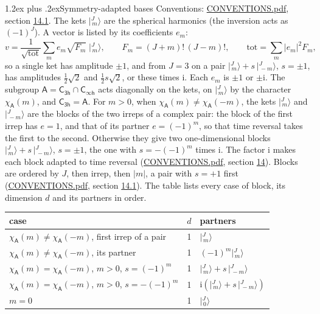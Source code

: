 \documentclass[10pt,a4paper]{article}
\makeatletter
\renewcommand\section{\@startsection{section}{1}{\z@}{-3ex plus -1ex minus -.2ex}%
  {1.2ex plus .2ex}{\normalfont\large\sffamily\bfseries\color{parttitle}}}
\numberwithin{equation}{section}
\newcommand{\grp}[1]{\mathsf{#1}}
\newcommand{\iunit}{\mathrm{i}}
\newcommand{\chiA}{\chi_{\grp{A}}}
\newcommand{\jm}[2]{\bigl\lvert{}^{#1}_{\,#2}\bigr\rangle}
\makeatother
\begin{document}
\section{Symmetry-adapted bases}\label{s:bases}
Conventions: \href{../../CONVENTIONS.pdf}{CONVENTIONS.pdf}, section \href{../../CONVENTIONS.pdf\#conv.14.1}{14.1}.
\leavevmode\label{n:index.m}\label{n:vector.ket}The kets $\jm{J}{m}$ are the spherical harmonics (the inversion acts as $(-1)^J$). \label{n:index.ketcoefficient}\label{n:vector.basis.symmetry}\label{n:index.ketweight}\label{n:index.total}A vector is listed by its coefficients $e_m$:
\begin{equation}\label{e:ket}v = \frac{1}{\sqrt{\mathrm{tot}}}\sum_m e_m\sqrt{F_m}\;\jm{J}{m},\qquad F_m = (J+m)!\,(J-m)!,\qquad \mathrm{tot} = \sum_m |e_m|^2F_m,\end{equation}
\leavevmode\label{n:index.pair.sign}so a single ket has amplitude $\pm1$, and from $J = 3$ on a pair $\jm{J}{m} + s\,\jm{J}{-m}$, $s = \pm1$, has amplitudes $\tfrac{1}{2}\sqrt{2}$ and $\tfrac{1}{2}s\sqrt{2}$, or these times $\iunit$. Each $e_m$ is $\pm1$ or $\pm\iunit$.
\leavevmode\label{n:group.A}\label{n:function.character.abelian}The subgroup $\grp{A} = \grp{C_{3h}}\cap\grp{C_{\infty h}}$ acts diagonally on the kets, on $\jm{J}{m}$ by the character $\chiA(m)$, and $\grp{C_{3h}} = \grp{A}$. For $m > 0$, when $\chiA(m) \ne \chiA(-m)$, the kets $\jm{J}{m}$ and $\jm{J}{-m}$ are the blocks of the two irreps of a complex pair: the block of the first irrep has $e = 1$, and that of its partner $e = (-1)^m$, so that time reversal takes the first to the second. Otherwise they give two one-dimensional blocks $\jm{J}{m} + s\,\jm{J}{-m}$, $s = \pm1$, the one with $s = -(-1)^m$ times $\iunit$. The factor $\iunit$ makes each block adapted to time reversal (\href{../../CONVENTIONS.pdf}{CONVENTIONS.pdf}, section \href{../../CONVENTIONS.pdf\#conv.14}{14}). Blocks are ordered by $J$, then irrep, then $|m|$, a pair with $s = +1$ first (\href{../../CONVENTIONS.pdf}{CONVENTIONS.pdf}, section \href{../../CONVENTIONS.pdf\#conv.14.1}{14.1}).
\leavevmode\label{n:head.case}\label{n:head.partners}The table lists every case of block, its dimension $d$ and its partners in order.
\begin{center}\begin{tabular}{@{}lrl@{}}\toprule
case & $d$ & partners\\\midrule
$\chiA(m) \ne \chiA(-m)$, first irrep of a pair & 1 & $\jm{J}{m}$\\
$\chiA(m) \ne \chiA(-m)$, its partner & 1 & $(-1)^m\jm{J}{m}$\\
$\chiA(m) = \chiA(-m)$, $m > 0$, $s = (-1)^m$ & 1 & $\jm{J}{m} + s\,\jm{J}{-m}$\\
$\chiA(m) = \chiA(-m)$, $m > 0$, $s = -(-1)^m$ & 1 & $\iunit(\jm{J}{m} + s\,\jm{J}{-m})$\\
$m = 0$ & 1 & $\jm{J}{0}$\\
\bottomrule\end{tabular}\end{center}
\end{document}

